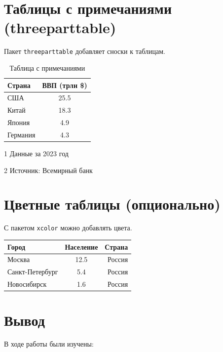 \documentclass[a4paper,12pt]{article}
\begin{document}
\section{Таблицы с примечаниями (threeparttable)}

Пакет \texttt{threeparttable} добавляет сноски к таблицам.

\begin{table}[H]
  \centering
  \begin{threeparttable}
    \caption{Таблица с примечаниями}
    \begin{tabular}{lS}
      \toprule
      Страна & {ВВП (трлн \$)} \\
      \midrule
      США & 25.5 \\
      Китай & 18.3 \\
      Япония & 4.9 \\
      Германия & 4.3 \\
      \bottomrule
    \end{tabular}
    \begin{tablenotes}
      \item[1] Данные за 2023 год
      \item[2] Источник: Всемирный банк
    \end{tablenotes}
  \end{threeparttable}
\end{table}

\section{Цветные таблицы (опционально)}

С пакетом \texttt{xcolor} можно добавлять цвета.


\begin{tabular}{lcr}
  \toprule
  Город & Население & Страна \\
  \midrule
  Москва & 12.5 & Россия \\
  Санкт-Петербург & 5.4 & Россия \\
  Новосибирск & 1.6 & Россия \\
  \bottomrule
\end{tabular}

\section{Вывод}

В ходе работы были изучены:
\end{document}
